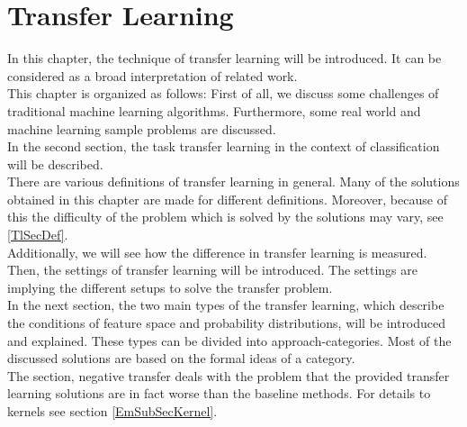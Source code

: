 \chapter{Transfer Learning}\label{Tl}
In this chapter, the technique of transfer learning will be introduced.
It can be considered as a broad interpretation of related work.\\
This chapter is organized as follows:    
First of all, we discuss some challenges of traditional machine learning algorithms.
Furthermore, some real world and machine learning sample problems are discussed.\\
In the second section, the task transfer learning in the context of classification will be described.\\
There are various definitions of transfer learning in general.
Many of the solutions obtained in this chapter are made for different definitions.
Moreover, because of this the difficulty of the problem which is solved by the solutions may vary, see \ref{TlSecDef}.\\
Additionally, we will see how the difference in transfer learning is measured.\\
Then, the settings of transfer learning will be introduced.
The settings are implying the different setups to solve the transfer problem.\\
In the next section, the two main types of the transfer learning, which describe the conditions of feature space and probability distributions, will be introduced and explained.
These types can be divided into approach-categories.
Most of the discussed solutions are based on the formal ideas of a category.\\
The section, negative transfer deals with the problem that the provided transfer learning solutions are in fact worse than the baseline methods.
For details to kernels see section \ref{EmSubSecKernel}.

